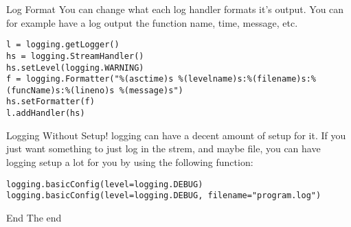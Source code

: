 \begin{frame}[containsverbatim]{Log Format}
  You can change what each log handler formats it's output. You can for example have a log output the function name, time, message, etc.
    \begin{verbatim}
l = logging.getLogger()
hs = logging.StreamHandler()
hs.setLevel(logging.WARNING)
f = logging.Formatter("%(asctime)s %(levelname)s:%(filename)s:%(funcName)s:%(lineno)s %(message)s")
hs.setFormatter(f)
l.addHandler(hs)
  \end{verbatim}
\end{frame}

\begin{frame}[containsverbatim]{Logging Without Setup!}
  logging can have a decent amount of setup for it. If you just want something to just log in the strem, and maybe file, you can have logging setup a lot for you by using the following function:
  \begin{verbatim}
logging.basicConfig(level=logging.DEBUG)
logging.basicConfig(level=logging.DEBUG, filename="program.log")
\end{verbatim}
\end{frame}


\begin{frame}[standout]{End}
  The end
\end{frame}


